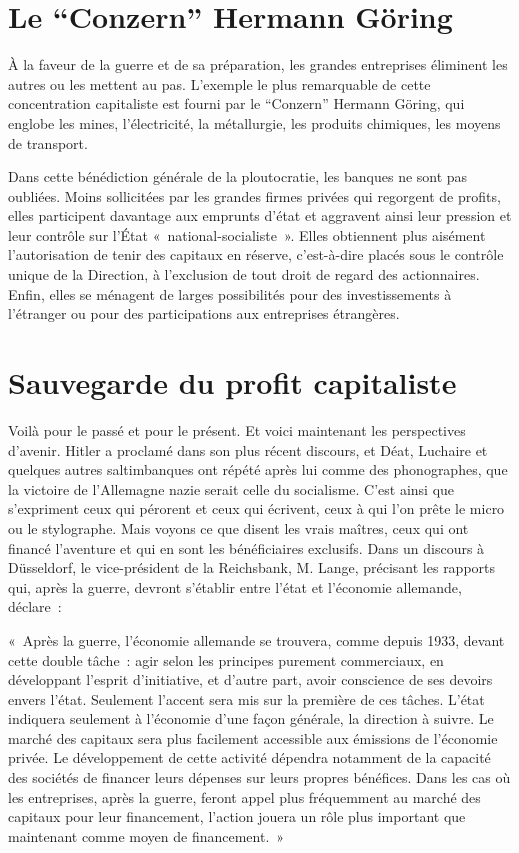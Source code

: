\documentclass[french,twoside]{book} %
\newenvironment{quoteblock}%
  {\begin{quoting}}
  {\end{quoting}}
\newenvironment{quotebar}{%
    \def\FrameCommand{{\color{rubric!10!}\vrule width 0.5em} \hspace{0.9em}}%
    \def\OuterFrameSep{\itemsep} %
    \MakeFramed {\advance\hsize-\width \FrameRestore}
  }%
  {%
    \endMakeFramed
  }
\renewenvironment{quoteblock}%
  {%
    \savenotes
    \setstretch{0.9}
    \normalfont
    \begin{quotebar}
  }
  {%
    \end{quotebar}
    \spewnotes
  }
\begin{document}
\section[Le “Conzern” Hermann Göring]{Le “Conzern” Hermann Göring}
\noindent À la faveur de la guerre et de sa préparation, les grandes entreprises éliminent les autres ou les mettent au pas. L’exemple le plus remarquable de cette concentration capitaliste est fourni par le “Conzern” Hermann Göring, qui englobe les mines, l’électricité, la métallurgie, les produits chimiques, les moyens de transport.\par
Dans cette bénédiction générale de la ploutocratie, les banques ne sont pas oubliées. Moins sollicitées par les grandes firmes privées qui regorgent de profits, elles participent davantage aux emprunts d’état et aggravent ainsi leur pression et leur contrôle sur l’État « national-socialiste ». Elles obtiennent plus aisément l’autorisation de tenir des capitaux en réserve, c’est-à-dire placés sous le contrôle unique de la Direction, à l’exclusion de tout droit de regard des actionnaires. Enfin, elles se ménagent de larges possibilités pour des investissements à l’étranger ou pour des participations aux entreprises étrangères.
\section[Sauvegarde du profit capitaliste]{Sauvegarde du profit capitaliste}
\noindent Voilà pour le passé et pour le présent. Et voici maintenant les perspectives d’avenir. Hitler a proclamé dans son plus récent discours, et Déat, Luchaire et quelques autres saltimbanques ont répété après lui comme des phonographes, que la victoire de l’Allemagne nazie serait celle du socialisme. C’est ainsi que s’expriment ceux qui pérorent et ceux qui écrivent, ceux à qui l’on prête le micro ou le stylographe. Mais voyons ce que disent les vrais maîtres, ceux qui ont financé l’aventure et qui en sont les bénéficiaires exclusifs. Dans un discours à Düsseldorf, le vice-président de la Reichsbank, M. Lange, précisant les rapports qui, après la guerre, devront s’établir entre l’état et l’économie allemande, déclare :\par

\begin{quoteblock}
 \noindent « Après la guerre, l’économie allemande se trouvera, comme depuis 1933, devant cette double tâche : agir selon les principes purement commerciaux, en développant l’esprit d’initiative, et d’autre part, avoir conscience de ses devoirs envers l’état. Seulement l’accent sera mis sur la première de ces tâches. L’état indiquera seulement à l’économie d’une façon générale, la direction à suivre. Le marché des capitaux sera plus facilement accessible aux émissions de l’économie privée. Le développement de cette activité dépendra notamment de la capacité des sociétés de financer leurs dépenses sur leurs propres bénéfices. Dans les cas où les entreprises, après la guerre, feront appel plus fréquemment au marché des capitaux pour leur financement, l’action jouera un rôle plus important que maintenant comme moyen de financement. »
 \end{quoteblock}
\end{document}

